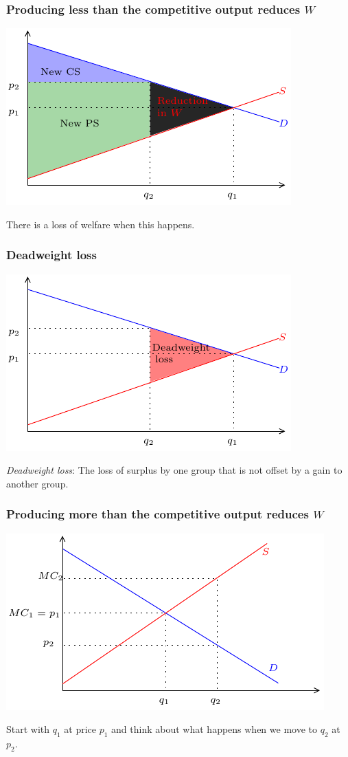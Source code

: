 \documentclass[xcolor=pdftex,dvipsnames]{beamer}
\begin{document}
\begin{frame}
\frametitle{Producing less than the  competitive output reduces $W$}
\begin{center}
\includegraphics{pics/CEEff4}
\end{center}
There is a loss of welfare when this happens.
\end{frame}



\begin{frame}
\frametitle{Deadweight loss}
\begin{center}
\includegraphics{pics/DWL}
\end{center}
\emph{Deadweight loss}: The loss of surplus by one group that is not
offset by a gain to another group.
\end{frame}



\begin{frame}
\frametitle{Producing more than the competitive output reduces $W$}
\begin{center}
\includegraphics{pics/CEEff5}
\end{center}
Start with $q_1$ at price $p_1$ and think about what happens when we
move to $q_2$ at $p_2$.
\end{frame}
\end{document}
